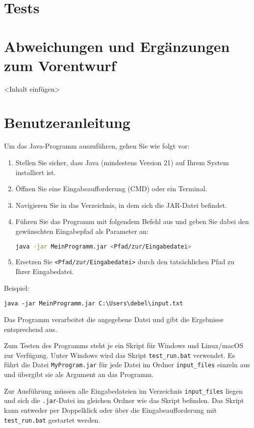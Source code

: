 \documentclass[a4paper,12pt]{report}
\begin{document}
\chapter {Tests}


\appendix
\chapter{Abweichungen und Ergänzungen zum Vorentwurf}
<Inhalt einfügen>

\chapter{Benutzeranleitung}

Um das Java-Programm auszuführen, gehen Sie wie folgt vor:

\begin{enumerate}
    \item Stellen Sie sicher, dass Java (mindestens Version 21) auf Ihrem System installiert ist.
    \item Öffnen Sie eine Eingabeaufforderung (CMD) oder ein Terminal.
    \item Navigieren Sie in das Verzeichnis, in dem sich die JAR-Datei befindet.
    \item Führen Sie das Programm mit folgendem Befehl aus und geben Sie dabei den gewünschten Eingabepfad als Parameter an:
    \begin{lstlisting}[language=bash]
    java -jar MeinProgramm.jar <Pfad/zur/Eingabedatei>
    \end{lstlisting}
    \item Ersetzen Sie \texttt{<Pfad/zur/Eingabedatei>} durch den tatsächlichen Pfad zu Ihrer Eingabedatei.
\end{enumerate}

Beispiel:


\texttt{java -jar MeinProgramm.jar C:\textbackslash Users\textbackslash debel\textbackslash input.txt}


Das Programm verarbeitet die angegebene Datei und gibt die Ergebnisse entsprechend aus.

Zum Testen des Programms steht je ein Skript für Windows und Linux/macOS zur Verfügung. Unter Windows wird das Skript \texttt{test\_run.bat} verwendet.
Es führt die Datei \texttt{MyProgram.jar} für jede Datei im Ordner \texttt{input\_files} einzeln aus und übergibt sie als Argument an das Programm.

Zur Ausführung müssen alle Eingabedateien im Verzeichnis \texttt{input\_files} liegen und sich die \texttt{.jar}-Datei im gleichen Ordner wie das Skript befinden.
Das Skript kann entweder per Doppelklick oder über die Eingabeaufforderung mit \texttt{test\_run.bat} gestartet werden.
\end{document}
